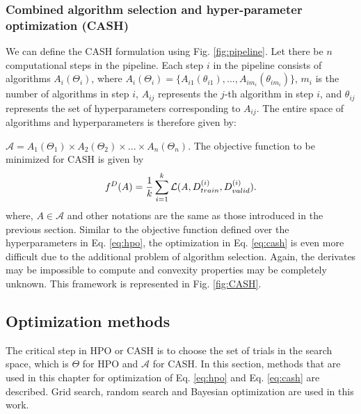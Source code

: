 \subsubsection{Combined algorithm selection and hyper-parameter optimization (CASH)}
\label{subsubsec_CASH}
We can define the CASH formulation using Fig. \ref{fig:pipeline}. Let there be $n$ computational steps in the pipeline. Each step $i$ in the pipeline consists of algorithms $A_i(\Theta_i)$, where $A_i(\Theta_i) = \{A_{i1}(\theta_{i1}), ..., A_{im_{i}}(\theta_{im_{i}})\}$, $m_{i}$ is the number of algorithms in step $i$, $A_{ij}$ represents the $j$-th algorithm in step $i$, and \textbf{$\theta_{ij}$} represents the set of hyperparameters corresponding to  $A_{ij}$. The entire space of algorithms and hyperparameters is therefore given by: \par
\noindent $\mathcal{A} = A_1(\Theta_1) \times A_2(\Theta_2) \times ... \times A_n(\Theta_n)$. The objective function to be minimized for CASH is given by
\begin{equation}
f^D(A) = \frac{1}{k}\sum_{i=1}^{k} \mathcal{L}(\emph{A}, D_{train}^{(i)}, D_{valid}^{(i)}).
\label{eq:cash}
\end{equation}
where, $A \in \mathcal{A}$ and other notations are the same as those introduced in the previous section.
Similar to the objective function defined over the hyperparameters in Eq. \ref{eq:hpo}, the optimization in Eq. \ref{eq:cash} is even more difficult due to the additional problem of algorithm selection. Again, the derivates may be impossible to compute and convexity properties may be completely unknown. This framework is represented in Fig. \ref{fig:CASH}.



\subsection{Optimization methods}
\label{optimization}
The critical step in HPO or CASH is to choose the set of trials in the search space, which is $\Theta$ for HPO and $\mathcal{A}$ for CASH. In this section, methods that are used in this chapter for optimization of Eq. \ref{eq:hpo} and Eq. \ref{eq:cash} are described. Grid search, random search and Bayesian optimization are used in this work.
